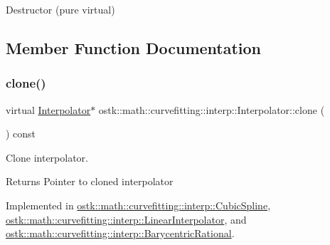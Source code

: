 Destructor (pure virtual) 



\subsection{Member Function Documentation}
\mbox{\label{classostk_1_1math_1_1curvefitting_1_1interp_1_1_interpolator_a717dc5547d117cccd73506b75c40c66a}} 
\subsubsection{\texorpdfstring{clone()}{clone()}}
{\footnotesize\ttfamily virtual \hyperlink{classostk_1_1math_1_1curvefitting_1_1interp_1_1_interpolator}{Interpolator}$\ast$ ostk\+::math\+::curvefitting\+::interp\+::\+Interpolator\+::clone (\begin{DoxyParamCaption}{ }\end{DoxyParamCaption}) const\hspace{0.3cm}{\ttfamily [pure virtual]}}



Clone interpolator. 

\begin{DoxyReturn}{Returns}
Pointer to cloned interpolator 
\end{DoxyReturn}


Implemented in \hyperlink{classostk_1_1math_1_1curvefitting_1_1interp_1_1_cubic_spline_a43d9d4ff7c386a5f3442dc8a617aa0cc}{ostk\+::math\+::curvefitting\+::interp\+::\+Cubic\+Spline}, \hyperlink{classostk_1_1math_1_1curvefitting_1_1interp_1_1_linear_interpolator_aaf48bb953f88279ff2cb755da611e937}{ostk\+::math\+::curvefitting\+::interp\+::\+Linear\+Interpolator}, and \hyperlink{classostk_1_1math_1_1curvefitting_1_1interp_1_1_barycentric_rational_a0fe27c0d93f957df0132354daa3e1368}{ostk\+::math\+::curvefitting\+::interp\+::\+Barycentric\+Rational}.

\mbox{\label{classostk_1_1math_1_1curvefitting_1_1interp_1_1_interpolator_aac2035e403234027b227479d1e1b544e}} 
